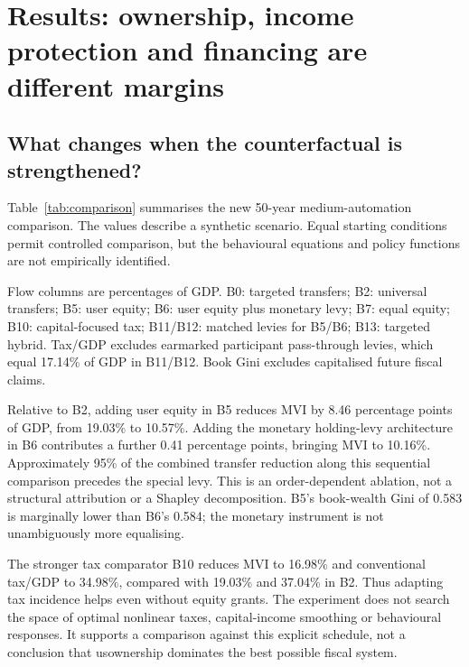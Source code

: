 \section{Results: ownership, income protection and financing are different margins}
\subsection{What changes when the counterfactual is strengthened?}
Table~\ref{tab:comparison} summarises the new 50-year medium-automation comparison. The values describe a synthetic scenario. Equal starting conditions permit controlled comparison, but the behavioural equations and policy functions are not empirically identified.

\begin{table}[htbp]\centering\small
\caption{Medium automation, model year 50: strengthened policy comparisons}\label{tab:comparison}

\par\smallskip\footnotesize Flow columns are percentages of GDP. B0: targeted transfers; B2: universal transfers; B5: user equity; B6: user equity plus monetary levy; B7: equal equity; B10: capital-focused tax; B11/B12: matched levies for B5/B6; B13: targeted hybrid. Tax/GDP excludes earmarked participant pass-through levies, which equal 17.14\% of GDP in B11/B12. Book Gini excludes capitalised future fiscal claims.
\end{table}

Relative to B2, adding user equity in B5 reduces MVI by 8.46 percentage points of GDP, from 19.03\% to 10.57\%. Adding the monetary holding-levy architecture in B6 contributes a further 0.41 percentage points, bringing MVI to 10.16\%. Approximately 95\% of the combined transfer reduction along this sequential comparison precedes the special levy. This is an order-dependent ablation, not a structural attribution or a Shapley decomposition. B5's book-wealth Gini of 0.583 is marginally lower than B6's 0.584; the monetary instrument is not unambiguously more equalising.

The stronger tax comparator B10 reduces MVI to 16.98\% and conventional tax/GDP to 34.98\%, compared with 19.03\% and 37.04\% in B2. Thus adapting tax incidence helps even without equity grants. The experiment does not search the space of optimal nonlinear taxes, capital-income smoothing or behavioural responses. It supports a comparison against this explicit schedule, not a conclusion that usownership dominates the best possible fiscal system.

